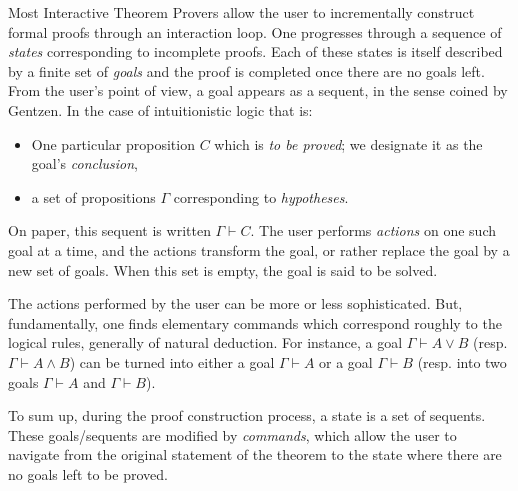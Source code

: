 
% 

% 



Most Interactive Theorem Provers allow the user to incrementally construct
formal proofs through an interaction loop. One progresses
through a sequence of {\em states} corresponding to incomplete proofs. Each
of these states is itself described by a finite set of {\em goals} and
the proof is completed once there are no goals left.
From the user's point of view, a goal appears as a sequent, in the
sense coined by Gentzen. In the case of intuitionistic logic that is:
\begin{itemize}
	\item One particular proposition $C$ which is {\em to be proved}; we
  designate it as the goal's {\em conclusion},
	\item a set of propositions $\Gamma$ corresponding to {\em hypotheses}.
\end{itemize}
On paper, this sequent is written $\Gamma\vdash C$.  The user performs
{\em actions} on one such goal at a time, and the actions transform
the goal, or rather replace the goal by a new set of goals. When this
set is empty, the goal is said to be solved.

The actions performed by the user can be more or less
sophisticated. But, fundamentally, one finds elementary commands which
correspond roughly to the logical rules, generally of natural
deduction. For instance, a goal $\Gamma\vdash A\vee B$
(resp. $\Gamma\vdash A\wedge B$) can be turned into either a goal
$\Gamma\vdash A$ or a goal $\Gamma\vdash B$ (resp. into two goals
$\Gamma\vdash A$ and $\Gamma\vdash B$).

To sum up, during the proof construction process, a state is a set of
sequents. These goals/sequents are modified by {\em commands}, which
allow the user to navigate from the original statement of the theorem
to the state where there are no goals left to be proved.

